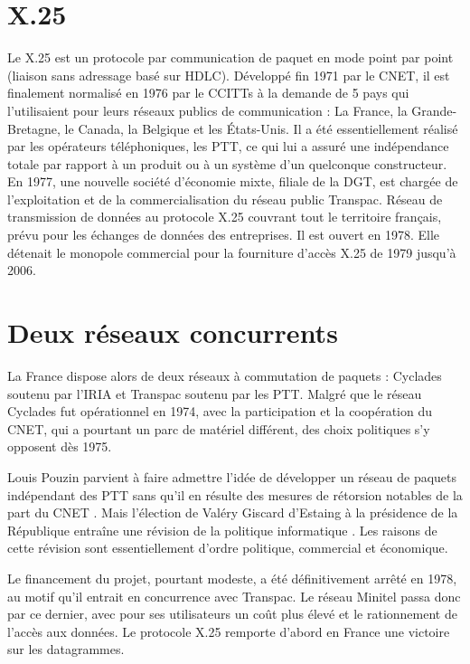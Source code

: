 \documentclass[12pt]{report}
\begin{document}
\section{X.25}

Le X.25 est un protocole par communication de paquet en mode point par point\cite{wikix25} (liaison sans adressage basé sur HDLC). Développé fin 1971 par le \gls{CNET}, il est finalement normalisé en 1976 par le \glspl{CCITT} à la demande de 5 pays qui l'utilisaient pour leurs réseaux publics de communication : La France, la Grande-Bretagne, le Canada, la Belgique et les États-Unis. Il a été essentiellement réalisé par les opérateurs téléphoniques, les \gls{PTT}, ce qui lui a assuré une indépendance totale par rapport à un produit ou à un système d'un quelconque constructeur. En 1977, une nouvelle société d'économie mixte, filiale de la DGT, est chargée de l'exploitation et de la commercialisation du réseau public Transpac. Réseau de transmission de données au protocole X.25 couvrant tout le territoire français, prévu pour les échanges de données des entreprises. Il est ouvert en 1978. Elle détenait le monopole commercial pour la fourniture d'accès X.25 de 1979 jusqu'à 2006\cite{wikitranspac}.

\section{Deux réseaux concurrents}

La France dispose alors de deux réseaux à commutation de paquets : Cyclades soutenu par l'IRIA et Transpac soutenu par les PTT. Malgré que le réseau Cyclades fut opérationnel en 1974, avec la participation et la coopération du CNET, qui a pourtant un parc de matériel différent, des choix politiques s'y opposent dès 1975.

Louis Pouzin parvient à faire admettre l'idée de développer un réseau de paquets indépendant des PTT \og sans qu'il en résulte des mesures de rétorsion notables de la part du CNET \fg. Mais l'élection de Valéry Giscard d'Estaing à la présidence de la République entraîne \og une révision de la politique informatique \fg. Les raisons de cette révision sont essentiellement d'ordre politique, commercial et économique.

Le financement du projet, pourtant modeste, a été définitivement arrêté en 1978, au motif qu'il entrait en concurrence avec Transpac. Le réseau Minitel passa donc par ce dernier, avec pour ses utilisateurs un coût plus élevé et le rationnement de l'accès aux données. Le protocole X.25 remporte d'abord en France une victoire sur les datagrammes\cite{wikicyc}.
\end{document}
